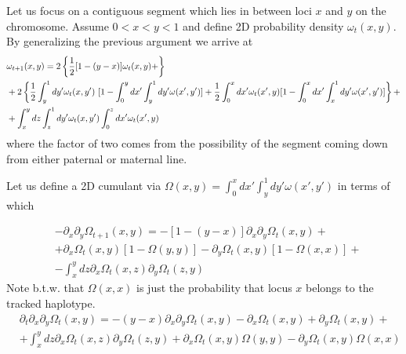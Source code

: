 \documentclass{article}
\begin{document}
Let us focus on a contiguous  segment which lies in between loci $x$ and $y$ on the chromosome. Assume $0<x<y<1$ and define 2D probability density $\omega_t (x,y)$. By generalizing the previous argument we arrive at
\begin{eqnarray}
&\omega_{t+1} (x,y) = 2 \left \{ {1 \over 2} [1-(y-x)]\omega_t (x,y)+\right \} \\
& +2\left \{{1 \over 2}\int_y^1 dy' \omega_t (x,y') \ [1-\int_0^ydx' \int_y^1 dy' \omega (x',y')]
+{1 \over 2}\int_0^x dx'\omega_t (x',y) [1-\int_0^xdx' \int_x^1 dy' \omega (x',y')]\right \}+\\
&+\int_x^ydz   \int_z^1dy'  \omega_t (x,y') \int_0^zdx' \omega_t (x',y)
\end{eqnarray}
where the factor of two comes from the possibility of the segment coming down from either paternal or maternal line.

Let us define a 2D cumulant via $\Omega (x,y)=\int_0^x dx' \int_y^1 dy' \omega (x',y')$ in terms of which

\begin{eqnarray}
&-\partial_x \partial_y \Omega_{t+1} (x,y) =  -[1-(y-x)]\partial_x \partial_y \Omega_t (x,y)+  \\
&  + \partial_x \Omega_t (x,y)[1-\Omega(y,y)]
- \partial_y \Omega_t (x,y)[1-\Omega(x,x)] +\\
&-\int_x^ydz   \partial_x  \Omega_t (x,z) \partial_y  \Omega_t (z,y)
\end{eqnarray}
Note b.t.w. that $\Omega (x,x)$ is just the probability that locus $x$ belongs to the tracked haplotype.
\begin{eqnarray}
&\partial_t \partial_x \partial_y \Omega_{t} (x,y) =  -(y-x)\partial_x \partial_y \Omega_t (x,y)  - \partial_x \Omega_t (x,y)+ \partial_y \Omega_t (x,y) +\\
&+\int_x^ydz   \partial_x  \Omega_t (x,z) \partial_y  \Omega_t (z,y)+\partial_x \Omega_t (x,y)\Omega(y,y)
- \partial_y \Omega_t (x,y)\Omega(x,x)
\end{eqnarray}
\end{document}
